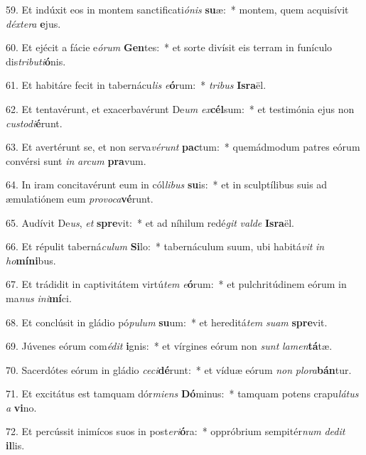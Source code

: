 59. Et indúxit eos in montem sanctificati\textit{ó}\textit{nis} \textbf{su}æ:~*  montem, quem acquisívit \textit{déx}\textit{te}\textit{ra} \textbf{e}jus.\

60. Et ejécit a fácie e\textit{ó}\textit{rum} \textbf{Gen}tes:~*  et sorte divísit eis terram in funículo dis\textit{tri}\textit{bu}\textit{ti}\textbf{ó}nis.\

61. Et habitáre fecit in tabernácu\textit{lis} \textit{e}\textbf{ó}rum:~*  \textit{tri}\textit{bus} \textbf{Is}\textbf{ra}ël.\

62. Et tentavérunt, et exacerbavérunt De\textit{um} \textit{ex}\textbf{cél}sum:~*  et testimónia ejus non \textit{cus}\textit{to}\textit{di}\textbf{é}runt.\

63. Et avertérunt se, et non serva\textit{vé}\textit{runt} \textbf{pac}tum:~*  quemádmodum patres eórum convérsi sunt \textit{in} \textit{ar}\textit{cum} \textbf{pra}vum.\

64. In iram concitavérunt eum in cól\textit{li}\textit{bus} \textbf{su}is:~*  et in sculptílibus suis ad æmulatiónem eum \textit{pro}\textit{vo}\textit{ca}\textbf{vé}runt.\

65. Audívit De\textit{us}, \textit{et} \textbf{spre}vit:~*  et ad níhilum redé\textit{git} \textit{val}\textit{de} \textbf{Is}\textbf{ra}ël.\

66. Et répulit taberná\textit{cu}\textit{lum} \textbf{Si}lo:~*  tabernáculum suum, ubi habitá\textit{vit} \textit{in} \textit{ho}\textbf{mí}\textbf{ni}bus.\

67. Et trádidit in captivitátem virtú\textit{tem} \textit{e}\textbf{ó}rum:~*  et pulchritúdinem eórum in ma\textit{nus} \textit{in}\textit{i}\textbf{mí}ci.\

68. Et conclúsit in gládio pó\textit{pu}\textit{lum} \textbf{su}um:~*  et hereditá\textit{tem} \textit{su}\textit{am} \textbf{spre}vit.\

69. Júvenes eórum com\textit{é}\textit{dit} \textbf{i}gnis:~*  et vírgines eórum non \textit{sunt} \textit{la}\textit{men}\textbf{tá}tæ.\

70. Sacerdótes eórum in gládio \textit{ce}\textit{ci}\textbf{dé}runt:~*  et víduæ eórum \textit{non} \textit{plo}\textit{ra}\textbf{bán}tur.\

71. Et excitátus est tamquam dór\textit{mi}\textit{ens} \textbf{Dó}minus:~*  tamquam potens crapu\textit{lá}\textit{tus} \textit{a} \textbf{vi}no.\

72. Et percússit inimícos suos in post\textit{e}\textit{ri}\textbf{ó}ra:~*  oppróbrium sempitér\textit{num} \textit{de}\textit{dit} \textbf{il}lis.\

